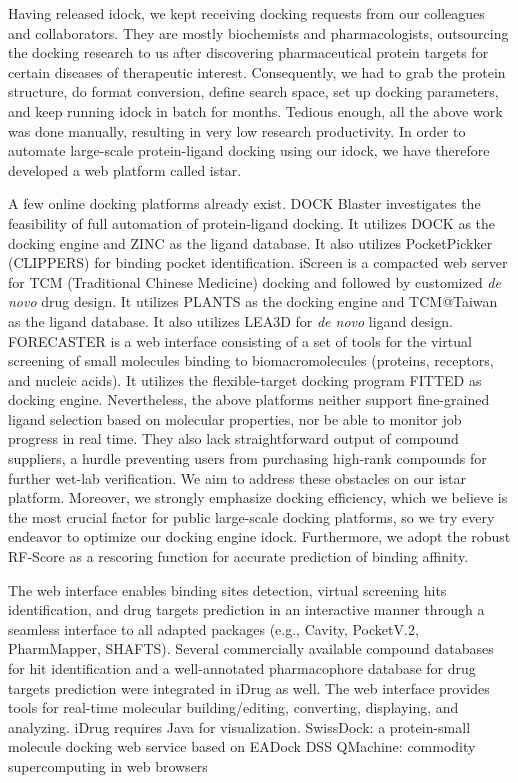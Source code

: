 Having released idock, we kept receiving docking requests from our colleagues and collaborators. They are mostly biochemists and pharmacologists, outsourcing the docking research to us after discovering pharmaceutical protein targets for certain diseases of therapeutic interest. Consequently, we had to grab the protein structure, do format conversion, define search space, set up docking parameters, and keep running idock in batch for months. Tedious enough, all the above work was done manually, resulting in very low research productivity. In order to automate large-scale protein-ligand docking using our idock, we have therefore developed a web platform called istar.

A few online docking platforms already exist. DOCK Blaster \cite{557} investigates the feasibility of full automation of protein-ligand docking. It utilizes DOCK \cite{1222} as the docking engine and ZINC \cite{532,1178} as the ligand database. It also utilizes PocketPickker (CLIPPERS) \cite{395} for binding pocket identification. iScreen \cite{899} is a compacted web server for TCM (Traditional Chinese Medicine) docking and followed by customized \textit{de novo} drug design. It utilizes PLANTS \cite{610,607,779} as the docking engine and TCM@Taiwan \cite{528} as the ligand database. It also utilizes LEA3D \cite{1223} for \textit{de novo} ligand design. FORECASTER \cite{1012} is a web interface consisting of a set of tools for the virtual screening of small molecules binding to biomacromolecules (proteins, receptors, and nucleic acids). It utilizes the flexible-target docking program FITTED \cite{602} as docking engine. Nevertheless, the above platforms neither support fine-grained ligand selection based on molecular properties, nor be able to monitor job progress in real time. They also lack straightforward output of compound suppliers, a hurdle preventing users from purchasing high-rank compounds for further wet-lab verification. We aim to address these obstacles on our istar platform. Moreover, we strongly emphasize docking efficiency, which we believe is the most crucial factor for public large-scale docking platforms, so we try every endeavor to optimize our docking engine idock. Furthermore, we adopt the robust RF-Score \cite{564} as a rescoring function for accurate prediction of binding affinity.

\citep{1396} The web interface enables binding sites detection, virtual screening hits identification, and drug targets prediction in an interactive manner through a seamless interface to all adapted packages (e.g., Cavity, PocketV.2, PharmMapper, SHAFTS). Several commercially available compound databases for hit identification and a well-annotated pharmacophore database for drug targets prediction were integrated in iDrug as well. The web interface provides tools for real-time molecular building/editing, converting, displaying, and analyzing.
\citep{1396} iDrug requires Java for visualization.
\citep{1425} SwissDock: a protein-small molecule docking web service based on EADock DSS
\citep{1405} QMachine: commodity supercomputing in web browsers

